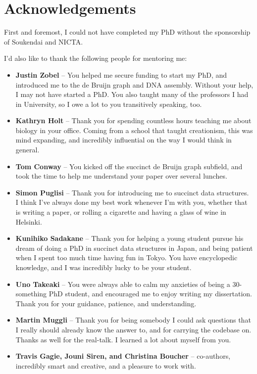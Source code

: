 \chapter*{Acknowledgements}

First and foremost, I could not have completed my PhD without the sponsorship of Soukendai and NICTA.

I’d also like to thank the following people for mentoring me:

\begin{itemize}
\item \textbf{Justin Zobel} -- You helped me secure funding to start my PhD, and introduced me to the de Bruijn graph and DNA assembly. Without your help, I may not have started a PhD. You also taught many of the professors I had in University, so I owe a lot to you transitively speaking, too.
\item \textbf{Kathryn Holt} -- Thank you for spending countless hours teaching me about biology in your office. Coming from a school that taught creationism, this was mind expanding, and incredibly influential on the way I would think in general.
\item \textbf{Tom Conway} -- You kicked off the succinct de Bruijn graph subfield, and took the time to help me understand your paper over several lunches.
\item \textbf{Simon Puglisi} -- Thank you for introducing me to succinct data structures. I think I’ve always done my best work whenever I’m with you, whether that is writing a paper, or rolling a cigarette and having a glass of wine in Helsinki.
\item \textbf{Kunihiko Sadakane} -- Thank you for helping a young student pursue his dream of doing a PhD in succinct data structures in Japan, and being patient when I spent too much time having fun in Tokyo. You have encyclopedic knowledge, and I was incredibly lucky to be your student.
\item \textbf{Uno Takeaki} -- You were always able to calm my anxieties of being a 30-something PhD student, and encouraged me to enjoy writing my dissertation. Thank you for your guidance, patience, and understanding.
\item \textbf{Martin Muggli} -- Thank you for being somebody I could ask questions that I really should already know the answer to, and for carrying the codebase on. Thanks as well for the real-talk. I learned a lot about myself from you.
\item \textbf{Travis Gagie, Jouni Siren, and Christina Boucher} -- co-authors, incredibly smart and creative, and a pleasure to work with.

\end{itemize}
